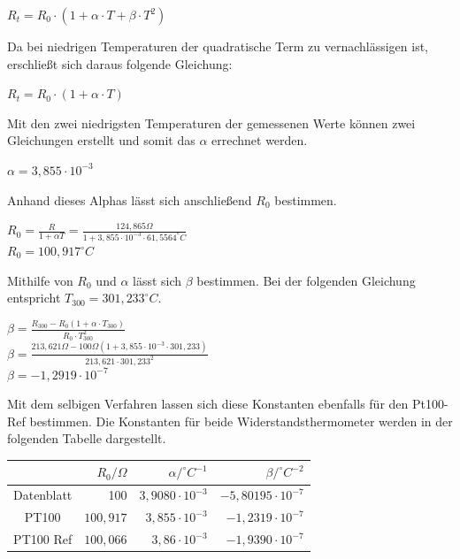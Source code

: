 \documentclass[a4paper,11pt,oneside]{article}
\begin{document}
\begin{center}
$R_t = R_0 \cdot (1 + \alpha \cdot T + \beta \cdot T^2)$
\end{center}

Da bei niedrigen Temperaturen der quadratische Term zu vernachlässigen ist, erschließt sich daraus folgende Gleichung:

\begin{center}
$R_t = R_0 \cdot (1 + \alpha \cdot T)$
\end{center}
 
Mit den zwei niedrigsten Temperaturen der gemessenen Werte können zwei Gleichungen erstellt und somit das $\alpha$ errechnet werden. 

\begin{center}
$\alpha = 3,855 \cdot 10^{-3}$
\end{center}

Anhand dieses Alphas lässt sich anschließend $R_0$ bestimmen.

\begin{center}
$R_0 = \frac{R}{1 + \alpha T} = \frac{124,865\Omega}{1 + 3,855 \cdot 10^{-3} \cdot 61,5564^\circ C}$\\
\vspace{0.5cm}
$R_0 = 100,917^\circ C$
\end{center}

Mithilfe von $R_0$ und $\alpha$ lässt sich $\beta$ bestimmen. Bei der folgenden Gleichung entspricht $T_{300} = 301,233^\circ C$.
\begin{center}
$\beta = \frac{R_{300} - R_0(1+\alpha \cdot T_{300})}{R_0 \cdot T_{300}^2}$\\
\vspace{0.5cm}
$\beta = \frac{213,621 \Omega - 100\Omega (1+ 3,855\cdot 10^{-3} \cdot 301,233)}{213,621 \cdot 301,233^2}$\\
\vspace{0.5cm}
$\beta = -1,2919 \cdot 10^{-7}$
\end{center}

Mit dem selbigen Verfahren lassen sich diese Konstanten ebenfalls für den Pt100-Ref bestimmen. Die Konstanten für beide Widerstandsthermometer werden in der folgenden Tabelle dargestellt.\\
\begin{center}
\begin{tabular}{|c|r|r|r|}
\hline 
 & $R_0 / \Omega$ & $\alpha/^\circ C^{-1}$ & $\beta / ^\circ C ^{-2}$ \\ 
\hline 
Datenblatt & 100 & $3,9080 \cdot 10 ^{-3}$ & $-5,80195 \cdot 10^{-7}$ \\ 
\hline 
PT100 & $100,917$ & $3,855 \cdot 10^{-3}$ & $-1,2319 \cdot 10^{-7}$ \\ 
\hline 
PT100 Ref & $100,066$ & $3,86 \cdot 10^{-3}$ & $-1,9390 \cdot 10^{-7}$ \\ 
\hline 
\end{tabular} 
\end{center}
\newpage
\end{document}
